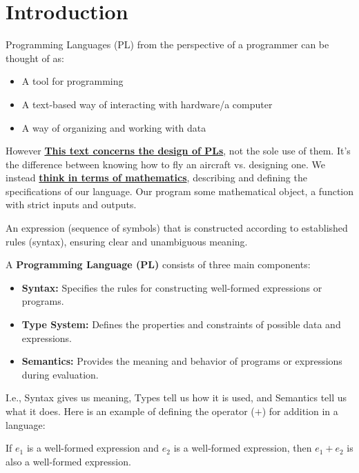 \section{Introduction}

Programming Languages (PL) from the perspective of a programmer can be thought of as:
\begin{itemize}
    \item  A tool for programming
    \item A text-based way of interacting
    with hardware/a computer
    \item A way of organizing and working
    with data
\end{itemize}

However \textbf{\underline{This text concerns the design of 
PLs}}, not the sole use of them. It's the difference between knowing how to fly 
an aircraft vs. designing one.
We instead \textbf{\underline{think in terms of mathematics}}, describing and defining
the specifications of our language. Our program some mathematical object,
a function with strict inputs and outputs.

\vspace{1em}
\begin{Def}

    An expression (sequence of symbols) that is constructed according to established rules (syntax),
    ensuring clear and unambiguous meaning.

\end{Def}

\begin{Def}

    A \textbf{Programming Language (PL)} consists of three main components:
    \begin{itemize}
        \item \textbf{Syntax:} Specifies the rules for constructing well-formed expressions or programs.
        \item \textbf{Type System:} Defines the properties and constraints of possible data and expressions.
        \item \textbf{Semantics:} Provides the meaning and behavior of programs or expressions during evaluation.
    \end{itemize}
\end{Def}

\noindent
I.e., Syntax gives us meaning, Types tell us how it is used, and Semantics tell us what it does. 
Here is an example of defining the operator ($+$) for addition in a language:
\begin{Example}

    \label{ex:well_formed_expr}
    If $e_1$ is a well-formed expression and $e_2$ is a well-formed expression, 
    then $e_1 + e_2$ is also a well-formed expression. 
\end{Example}

